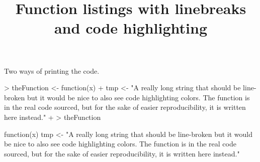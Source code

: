 \documentclass[a4paper]{article}
\title{Function listings with linebreaks and code highlighting}
\begin{document}

\maketitle

Two ways of printing the code.



\begin{Schunk}
\begin{Sinput}
> theFunction <- function(x) {
+   tmp <- "A really long string that should be line-broken but it would be nice to also see code highlighting colors. The function is in the real code sourced, but for the sake of easier reproducibility, it is written here instead."
+ }
> theFunction
\end{Sinput}
\begin{Soutput}
function(x) {
  tmp <- "A really long string that should be line-broken but it would be nice to also see code highlighting colors. The function is in the real code sourced, but for the sake of easier reproducibility, it is written here instead."
}
\end{Soutput}
\end{Schunk}
\end{document}
